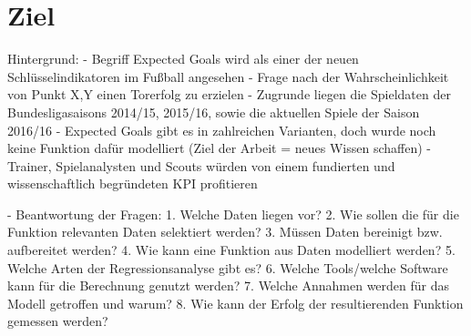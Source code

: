 \section{Ziel}
Hintergrund:
-	Begriff Expected Goals wird als einer der neuen Schlüsselindikatoren im Fußball angesehen
-	Frage nach der Wahrscheinlichkeit von Punkt X,Y einen Torerfolg zu erzielen
-	Zugrunde liegen die Spieldaten der Bundesligasaisons 2014/15, 2015/16, sowie die aktuellen Spiele der Saison 2016/16
-	Expected Goals gibt es in zahlreichen Varianten, doch wurde noch keine Funktion dafür modelliert (Ziel der Arbeit = neues Wissen schaffen)
-	Trainer, Spielanalysten und Scouts würden von einem fundierten und wissenschaftlich begründeten KPI profitieren

- Beantwortung der Fragen:
1.	Welche Daten liegen vor?
2.	Wie sollen die für die Funktion relevanten Daten selektiert werden?
3.	Müssen Daten bereinigt bzw. aufbereitet werden?
4.	Wie kann eine Funktion aus Daten modelliert werden?
5.	Welche Arten der Regressionsanalyse gibt es?
6.	Welche Tools/welche Software kann für die Berechnung genutzt werden?
7.	Welche Annahmen werden für das Modell getroffen und warum?
8.	Wie kann der Erfolg der resultierenden Funktion gemessen werden?
